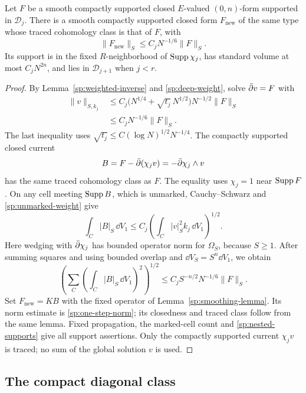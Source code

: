 \begin{lemma}\label{sp:one-step}
Let $F$ be a smooth compactly supported closed $E$-valued $(0,n)$-form
supported in $\mathcal D_j$.  There is a smooth compactly supported
closed form $F_{\mathrm{new}}$ of the same type whose traced
cohomology class is that of $F$, with
\begin{equation}\label{sp:one-step-norm}
 \|F_{\mathrm{new}}\|_S\le C_jN^{-1/6}\|F\|_S.
\end{equation}
Its support is in the fixed $R$-neighborhood of $\operatorname{Supp}\chi_j$, has
standard volume at most $C_jN^{2n}$, and lies in $\mathcal D_{j+1}$
when $j<r$.
\end{lemma}

\begin{proof}
By Lemma~\ref{sp:weighted-inverse} and
\eqref{sp:deep-weight}, solve $\bar\partial v=F$ with
\begin{align*}
 \|v\|_{S,k_j}
 &\le C_j\bigl(N^{1/4}+\sqrt{t_j}\,N^{1/2}\bigr)
                              N^{-1/2}\|F\|_S\\
 &\le C_jN^{-1/6}\|F\|_S.
\end{align*}
The last inequality uses
$\sqrt{t_j}\le C(\log N)^{1/2}N^{-1/4}$.
The compactly supported closed current
\[
 B=F-\bar\partial(\chi_jv)=-\bar\partial\chi_j\wedge v
\]
has the same traced cohomology class as $F$.  The equality uses
$\chi_j=1$ near $\operatorname{Supp} F$.  On any cell meeting $\operatorname{Supp} B$, which is
unmarked, Cauchy--Schwarz and \eqref{sp:unmarked-weight} give
\[
 \int_C|B|_S\,\dd V_1
 \le C_j\left(\int_C|v|_S^2 k_j\,\dd V_1\right)^{1/2}.
\]
Here wedging with $\bar\partial\chi_j$ has bounded operator norm for
$\Omega_S$, because $S\ge1$.  After summing squares and using bounded
overlap and $\dd V_S=S^n\dd V_1$, we obtain
\[
 \left(\sum_C\left(\int_C|B|_S\,\dd V_1\right)^2\right)^{1/2}
 \le C_jS^{-n/2}N^{-1/6}\|F\|_S.
\]
Set $F_{\mathrm{new}}=KB$ with the fixed operator of
Lemma~\ref{sp:smoothing-lemma}.  Its norm estimate is
\eqref{sp:one-step-norm}; its closedness and traced class follow from
the same lemma.  Fixed propagation, the marked-cell count and
\eqref{sp:nested-supports} give all support assertions.  Only the
compactly supported current $\chi_jv$ is traced; no sum of the global
solution $v$ is used.
\end{proof}

\subsection{The compact diagonal class}
\label{sp:diagonal-class}


